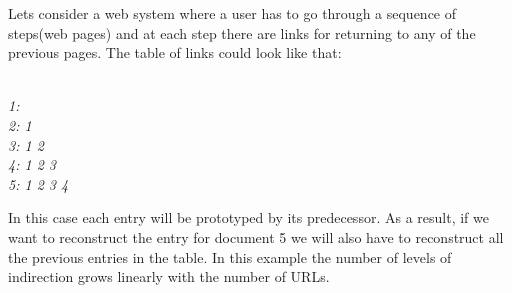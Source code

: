 \documentclass[a4paper, notitlepage]{article}
\begin{document}
Lets consider a web system where a user has to go through a sequence of steps(web pages) and at each step there are links for returning to any of the previous pages. The table of links could look like that:

\emph{
\\
1:\\
2: 1\\
3: 1 2\\
4: 1 2 3\\
5: 1 2 3 4\\
}

In this case each entry will be prototyped by its predecessor. As a result, if we want to reconstruct the entry for document 5 we will also have to reconstruct all the previous entries in the table. In this example the number of levels of indirection grows linearly with the number of URLs.
\end{document}
